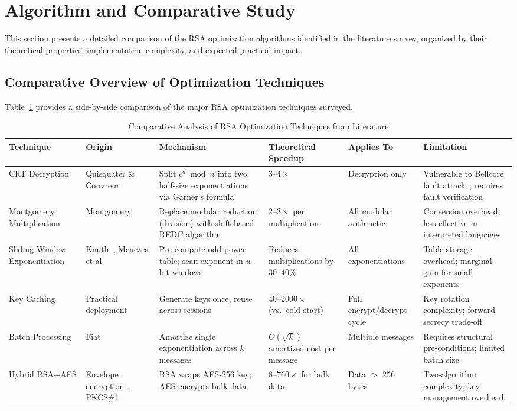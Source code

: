 \documentclass[journal]{IEEEtran}
\begin{document}
\section{Algorithm and Comparative Study}
\label{sec:comparative}

This section presents a detailed comparison of the RSA optimization algorithms identified in the literature survey, organized by their theoretical properties, implementation complexity, and expected practical impact.

\subsection{Comparative Overview of Optimization Techniques}

Table~\ref{tab:algo_compare} provides a side-by-side comparison of the major RSA optimization techniques surveyed.

\begin{table}[!t]
\caption{Comparative Analysis of RSA Optimization Techniques from Literature}
\label{tab:algo_compare}
\centering
\small
\begin{tabular}{|p{2.2cm}|p{1.5cm}|p{2.8cm}|p{2.2cm}|p{1.5cm}|p{2.5cm}|}
\hline
\textbf{Technique} & \textbf{Origin} & \textbf{Mechanism} & \textbf{Theoretical Speedup} & \textbf{Applies To} & \textbf{Limitation} \\
\hline
CRT Decryption & Quisquater \& Couvreur~\cite{quisquater1982} & Split $c^d \bmod n$ into two half-size exponentiations via Garner's formula & $3$--$4\times$ & Decryption only & Vulnerable to Bellcore fault attack~\cite{boneh2001}; requires fault verification \\
\hline
Montgomery Multiplication & Montgomery~\cite{montgomery1985} & Replace modular reduction (division) with shift-based REDC algorithm & $2$--$3\times$ per multiplication & All modular arithmetic & Conversion overhead; less effective in interpreted languages \\
\hline
Sliding-Window Exponentiation & Knuth~\cite{knuth1997}, Menezes et al.~\cite{menezes2001} & Pre-compute odd power table; scan exponent in $w$-bit windows & Reduces multiplications by $30$--$40\%$ & All exponentiations & Table storage overhead; marginal gain for small exponents \\
\hline
Key Caching & Practical deployment~\cite{fiat1997} & Generate keys once, reuse across sessions & $40$--$2000\times$ (vs.\ cold start) & Full encrypt/decrypt cycle & Key rotation complexity; forward secrecy trade-off \\
\hline
Batch Processing & Fiat~\cite{fiat1997} & Amortize single exponentiation across $k$ messages & $O(\sqrt{k})$ amortized cost per message & Multiple messages & Requires structural pre-conditions; limited batch size \\
\hline
Hybrid RSA+AES & Envelope encryption~\cite{menezes2001}, PKCS\#1~\cite{pkcs1_2016} & RSA wraps AES-256 key; AES encrypts bulk data & $8$--$760\times$ for bulk data & Data $>$ 256 bytes & Two-algorithm complexity; key management overhead \\
\hline
\end{tabular}
\end{table}
\end{document}
